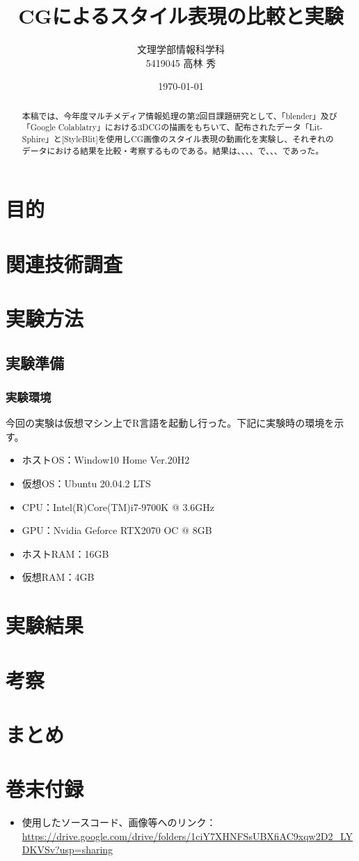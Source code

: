 \documentclass[dvipdfmx]{jsarticle}
\title{CGによるスタイル表現の比較と実験}
\author{文理学部情報科学科\\5419045 高林 秀}
\date{\today}
\begin{document}
\maketitle

\begin{abstract}
  本稿では、今年度マルチメディア情報処理の第2回目課題研究として、「blender」及び「Google Colablatry」における3DCGの描画をもちいて、配布されたデータ「Lit-Sphire」と[StyleBlit]を使用しCG画像のスタイル表現の動画化を実験し、それぞれのデータにおける結果を比較・考察するものである。結果は、、、、で、、、であった。
\end{abstract}

\section{目的}
\section{関連技術調査}
\section{実験方法}
  \subsection{実験準備}
    \subsubsection{実験環境}
    今回の実験は仮想マシン上でR言語を起動し行った。下記に実験時の環境を示す。
    \begin{itemize}
      \item ホストOS：Window10 Home Ver.20H2
      \item 仮想OS：Ubuntu 20.04.2 LTS
      \item CPU：Intel(R)Core(TM)i7-9700K @ 3.6GHz
      \item GPU：Nvidia Geforce RTX2070 OC @ 8GB
      \item ホストRAM：16GB
      \item 仮想RAM：4GB
    \end{itemize}
\section{実験結果}
\section{考察}
\section{まとめ}


\section{巻末付録}
\begin{itemize}
  \item 使用したソースコード、画像等へのリンク：\url{https://drive.google.com/drive/folders/1ciY7XHNFSsUBXfiAC9xqw2D2_LYDKVSv?usp=sharing}
\end{itemize}
\begin{thebibliography}{99}

\end{thebibliography}
\end{document}
